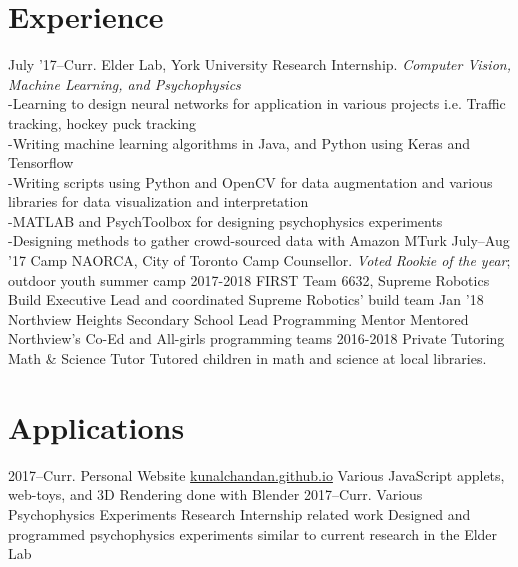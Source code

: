 \documentclass[]{chandan-cv}
\begin{document}
\section{Experience}

\begin{entrylist}
  \entry
    {July '17–Curr.}
    {Elder Lab, York University}
    {Research Internship.}
    {\emph{Computer Vision, Machine Learning, and Psychophysics}\\-Learning to design neural networks for application in various projects i.e. Traffic tracking, hockey puck tracking\\-Writing machine learning algorithms in Java, and Python using Keras and Tensorflow\\-Writing scripts using Python and OpenCV for data augmentation and various libraries for data visualization and interpretation\\-MATLAB and PsychToolbox for designing psychophysics experiments\\-Designing methods to gather crowd-sourced data with Amazon MTurk}
  \entry
    {July–Aug '17}
    {Camp NAORCA, City of Toronto}
    {Camp Counsellor.}
    {\emph{Voted Rookie of the year}; outdoor youth summer camp}
  \entry
    {2017-2018}
    {FIRST Team 6632, Supreme Robotics}
    {Build Executive}
    {Lead and coordinated Supreme Robotics' build team}
  \entry
    {Jan '18}
    {Northview Heights Secondary School}
    {Lead Programming Mentor}
    {Mentored Northview's Co-Ed and All-girls programming teams}
  \entry
    {2016-2018}
    {Private Tutoring}
    {Math \& Science Tutor}
    {Tutored children in math and science at local libraries.}
\end{entrylist}

\section{Applications}

\begin{entrylist}
  \entry
    {2017–Curr.}
    {Personal Website}
    {\href{https://kunalchandan.github.io}{kunalchandan.github.io}}
    {Various JavaScript applets, web-toys, and 3D Rendering done with Blender}
  \entry
    {2017–Curr.}
    {Various Psychophysics Experiments}
    {Research Internship related work}
    {Designed and programmed psychophysics experiments similar to current research in the Elder Lab}
\end{entrylist}

\newpage
\end{document}
